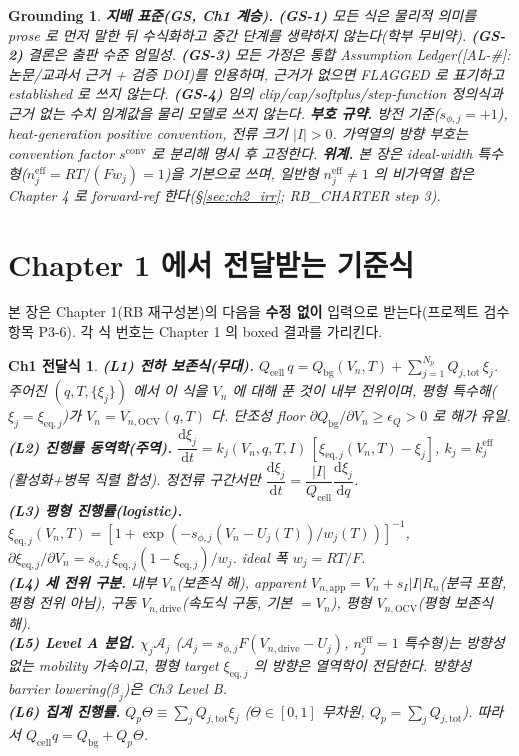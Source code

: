 \documentclass[11pt,a4paper]{article}
\newtheorem*{groundingbox}{Grounding}
\newtheorem*{linkbox}{Ch1 전달식}
\newcommand{\dd}{\mathrm{d}}
\newcommand{\eff}{\mathrm{eff}}
\newcommand{\eq}{\mathrm{eq}}
\newcommand{\app}{\mathrm{app}}
\newcommand{\drive}{\mathrm{drive}}
\newcommand{\bg}{\mathrm{bg}}
\newcommand{\cell}{\mathrm{cell}}
\newcommand{\OCV}{\mathrm{OCV}}
\newcommand{\tot}{\mathrm{tot}}
\newcommand{\conv}{\mathrm{conv}}
\newcommand{\AL}[1]{\textsf{[AL-#1]}}
\begin{document}
\begin{groundingbox}
\textbf{지배 표준(GS, Ch1 계승).} \textbf{(GS-1)} 모든 식은 물리적 의미를 prose 로 먼저 말한 뒤 수식화하고
중간 단계를 생략하지 않는다(학부 무비약). \textbf{(GS-2)} 결론은 출판 수준 엄밀성. \textbf{(GS-3)} 모든 가정은
통합 Assumption Ledger(\AL{\#}: 논문/교과서 근거 + 검증 DOI)를 인용하며, 근거가 없으면 FLAGGED 로 표기하고
established 로 쓰지 않는다. \textbf{(GS-4)} 임의 clip/cap/softplus/step-function 정의식과 근거 없는 수치
임계값을 물리 모델로 쓰지 않는다. \textbf{부호 규약.} 방전 기준($s_{\phi,j}=+1$), heat-generation positive
convention, 전류 크기 $|I|>0$. 가역열의 방향 부호는 convention factor $s^{\conv}$ 로 분리해 명시 후 고정한다.
\textbf{위계.} 본 장은 \emph{ideal-width 특수형}($n_j^{\eff}=RT/(Fw_j)=1$)을 기본으로 쓰며, 일반형
$n_j^{\eff}\ne1$ 의 비가역열 합은 Chapter 4 로 forward-ref 한다(\S\ref{sec:ch2_irr}; RB\_CHARTER step 3).
\end{groundingbox}

\tableofcontents
\newpage

\section{Chapter 1 에서 전달받는 기준식}\label{sec:ch2_inherit}
본 장은 Chapter 1(RB 재구성본)의 다음을 \textbf{수정 없이} 입력으로 받는다(프로젝트 검수 항목 P3-6). 각 식 번호는
Chapter 1 의 boxed 결과를 가리킨다.
\begin{linkbox}
\textbf{(L1) 전하 보존식(무대).} $Q_\cell\,q=Q_\bg(V_n,T)+\sum_{j=1}^{N_p}Q_{j,\tot}\,\xi_j$. 주어진
$(q,T,\{\xi_j\})$ 에서 이 식을 $V_n$ 에 대해 푼 것이 내부 전위이며, 평형 특수해($\xi_j=\xi_{\eq,j}$)가
$V_n=V_{n,\OCV}(q,T)$ 다. 단조성 floor $\partial Q_\bg/\partial V_n\ge\epsilon_Q>0$ 로 해가 유일.\\
\textbf{(L2) 진행률 동역학(주역).} $\dfrac{\dd\xi_j}{\dd t}=k_j(V_n,q,T,I)\,[\xi_{\eq,j}(V_n,T)-\xi_j]$,
$k_j=k_j^{\eff}$(활성화+병목 직렬 합성). 정전류 구간서만 $\dfrac{\dd\xi_j}{\dd t}=\dfrac{|I|}{Q_\cell}\dfrac{\dd\xi_j}{\dd q}$.\\
\textbf{(L3) 평형 진행률(logistic).} $\xi_{\eq,j}(V_n,T)=[1+\exp(-s_{\phi,j}(V_n-U_j(T))/w_j(T))]^{-1}$,
$\partial\xi_{\eq,j}/\partial V_n=s_{\phi,j}\,\xi_{\eq,j}(1-\xi_{\eq,j})/w_j$. ideal 폭 $w_j=RT/F$.\\
\textbf{(L4) 세 전위 구분.} 내부 $V_n$(보존식 해), apparent $V_{n,\app}=V_n+s_I|I|R_n$(분극 포함, 평형
전위 아님), 구동 $V_{n,\drive}$(속도식 구동, 기본 $=V_n$), 평형 $V_{n,\OCV}$(평형 보존식 해).\\
\textbf{(L5) Level A 분업.} $\chi_j\mathcal A_j$ ($\mathcal A_j=s_{\phi,j}F(V_{n,\drive}-U_j)$, $n_j^{\eff}=1$
특수형)는 \emph{방향성 없는} mobility 가속이고, 평형 target $\xi_{\eq,j}$ 의 방향은 열역학이 전담한다.
방향성 barrier lowering($\beta_j$)은 Ch3 Level B.\\
\textbf{(L6) 집계 진행률.} $Q_p\Theta\equiv\sum_jQ_{j,\tot}\xi_j$ ($\Theta\in[0,1]$ 무차원,
$Q_p=\sum_jQ_{j,\tot}$). 따라서 $Q_\cell q=Q_\bg+Q_p\Theta$.
\end{linkbox}
\end{document}
